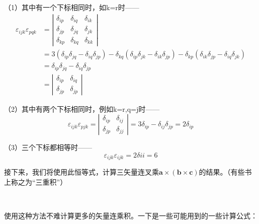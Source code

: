 \documentclass{ctexart}
\begin{document}
\begin{结论}{}{}
   （1）其中有一个下标相同时，如k=r时——
   $$
\begin{aligned}
\varepsilon_{i j k} \varepsilon_{p q k} &=\left|\begin{array}{lll}
\delta_{i p} & \delta_{i q} & \delta_{i k} \\
\delta_{j p} & \delta_{j q} & \delta_{j k} \\
\delta_{k p} & \delta_{k q} & \delta_{k k}
\end{array}\right| \\
&=3\left(\delta_{i p} \delta_{j q}-\delta_{i q} \delta_{j p}\right)-\delta_{k q}\left(\delta_{i p} \delta_{j k}-\delta_{i k} \delta_{j p}\right)-\delta_{k p}\left(\delta_{i k} \delta_{j p}-\delta_{i q} \delta_{j k}\right) \\
&=\delta_{i p} \delta_{j q}-\delta_{i q} \delta_{j p} \\
&=\left|\begin{array}{ll}
\delta_{i p} & \delta_{i q} \\
\delta_{j p} & \delta_{j p}
\end{array}\right|
\end{aligned}
$$
\par
   （2）其中有两个下标相同时，例如k=r,q=j时——
   $$
\varepsilon_{i j k} \varepsilon_{p j k}=\left|\begin{array}{ll}
\delta_{i p} & \delta_{i j} \\
\delta_{j p} & \delta_{j j}
\end{array}\right|=3 \delta_{i p}-\delta_{i j} \delta_{j p}=2 \delta_{i p}
$$
\par
   （3）三个下标都相等时——
   $$
   \varepsilon_{i j k} \varepsilon_{i j k} =2\delta{ii}=6
   $$
\end{结论}
    接下来，我们将使用此恒等式，计算三矢量连叉乘$\boldsymbol{a} \times (\boldsymbol{b} \times \boldsymbol{c})$的结果。（有些书上称之为“三重积”）
    $$
    \begin{aligned}
     \times( \times {})=& a_{q} _{q}} \times \varepsilon_{i j k} b_{i} c_{j} \boldsymbol{e}_{k} \\
    &=\varepsilon_{i j k} \varepsilon_{p q k} a_{q} b_{i} c_{j} \boldsymbol{e}_{p} \\
    &=\left(\delta_{i p} \delta_{j q}-\delta_{i q} \delta_{j p}\right) a_{q} b_{i} c_{j}  \boldsymbol{e}_{p} \\
     &={a}_{q}{c}_{j} \delta_{j q}{b}_{i}(\boldsymbol{e}_{i} \cdot \boldsymbol{e}_{p} \cdot \boldsymbol{e}_{p})-{a}_{q}{b}_{i} \delta_{i q}{c}_{j}(\boldsymbol{e}_{j} \cdot \boldsymbol{e}_{p} \cdot \boldsymbol{e}_{p})\\
    &=(\boldsymbol{a} \cdot \boldsymbol{c}) ({b}_{i} \boldsymbol{e}_{i})-(\boldsymbol{a} \cdot \boldsymbol{b})({c}_{j} \boldsymbol{e}_{j}) \\
    &=(\boldsymbol{a} \cdot \boldsymbol{c}) \boldsymbol{b}-(\boldsymbol{a} \cdot \boldsymbol{b}) \boldsymbol{c}
    \end{aligned}
    $$
    \par
    使用这种方法不难计算更多的矢量连乘积。一下是一些可能用到的一些计算公式：
    
\end{document}
